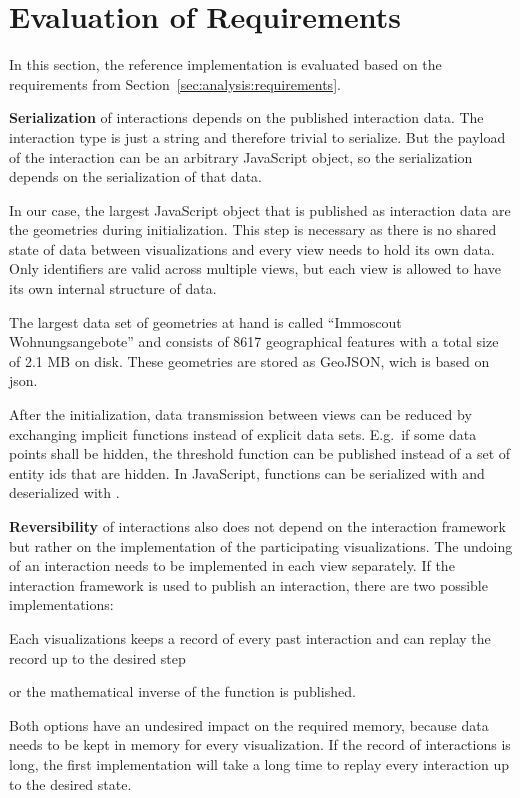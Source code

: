 \section{Evaluation of Requirements}\label{sec:evaluation:requirements}
In this section, the reference implementation is evaluated based on the requirements from Section~\ref{sec:analysis:requirements}.

\textbf{Serialization} of interactions depends on the published interaction data.
The interaction type is just a string and therefore trivial to serialize.
But the payload of the interaction can be an arbitrary JavaScript object, so the serialization depends on the serialization of that data.

In our case, the largest JavaScript object that is published as interaction data are the geometries during initialization.
This step is necessary as there is no shared state of data between visualizations and every view needs to hold its own data.
Only identifiers are valid across multiple views, but each view is allowed to have its own internal structure of data.

The largest data set of geometries at hand is called ``Immoscout Wohnungsangebote'' and consists of 8617 geographical features with a total size of 2.1 MB on disk.
These geometries are stored as GeoJSON, wich is based on \gls{json}.

After the initialization, data transmission between views can be reduced by exchanging implicit functions instead of explicit data sets.
E.g.\ if some data points shall be hidden, the threshold function can be published instead of a set of entity ids that are hidden.
In JavaScript, functions can be serialized with  and deserialized with .


\textbf{Reversibility} of interactions also does not depend on the interaction framework but rather on the implementation of the participating visualizations.
The undoing of an interaction needs to be implemented in each view separately.
If the interaction framework is used to publish an  interaction, there are two possible implementations:
\begin{enumerate*}[label=(\arabic*)]
  \item
    Each visualizations keeps a record of every past interaction and can replay the record up to the desired step
    \item
    or the mathematical inverse of the function is published.
\end{enumerate*}
Both options have an undesired impact on the required memory, because data needs to be kept in memory for every visualization.
If the record of interactions is long, the first implementation will take a long time to replay every interaction up to the desired state.

